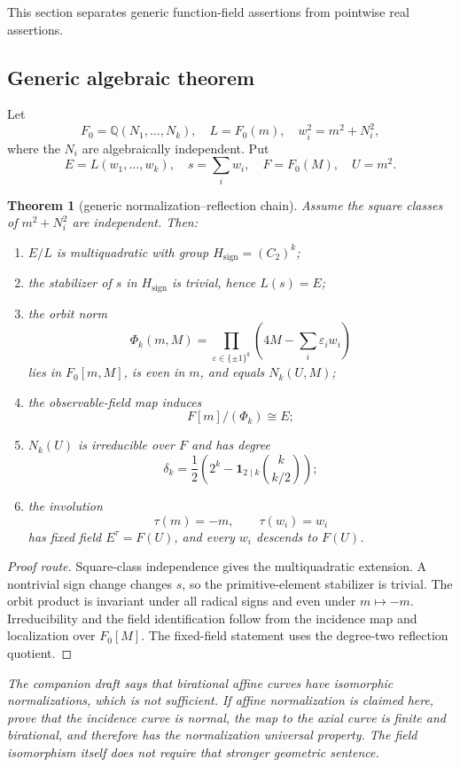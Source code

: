 \documentclass[11pt]{article}
\newtheorem{theorem}{Theorem}[section]
\theoremstyle{remark}
\newcommand{\Q}{\mathbb Q}
\newcommand{\proofstop}[1]{\par\medskip\noindent{\color{red!75!black}\textbf{STOP--PROOF.}} \textit{#1}\par\medskip}
\begin{document}
This section separates generic function-field assertions from pointwise real
assertions.

\subsection{Generic algebraic theorem}

Let
\[
F_0=\Q(N_1,\ldots,N_k),\quad L=F_0(m),\quad
w_i^2=m^2+N_i^2,
\]
where the $N_i$ are algebraically independent. Put
\[
E=L(w_1,\ldots,w_k),\quad s=\sum_iw_i,\quad
F=F_0(M),\quad U=m^2.
\]

\begin{theorem}[generic normalization--reflection chain]
\label{thm:genericcover}
Assume the square classes of $m^2+N_i^2$ are independent. Then:
\begin{enumerate}[label=(\roman*)]
\item $E/L$ is multiquadratic with group $H_{\mathrm{sign}}=(C_2)^k$;
\item the stabilizer of $s$ in $H_{\mathrm{sign}}$ is trivial, hence
$L(s)=E$;
\item the orbit norm
\[
\Phi_k(m,M)=
\prod_{\varepsilon\in\{\pm1\}^k}
\left(4M-\sum_i\varepsilon_iw_i\right)
\]
lies in $F_0[m,M]$, is even in $m$, and equals $N_k(U,M)$;
\item the observable-field map induces
\[
F[m]/(\Phi_k)\cong E;
\]
\item $N_k(U)$ is irreducible over $F$ and has degree
\[
\delta_k=\frac12\left(
2^k-\mathbf 1_{2\mid k}\binom{k}{k/2}
\right);
\]
\item the involution
\[
\tau(m)=-m,\qquad\tau(w_i)=w_i
\]
has fixed field $E^\tau=F(U)$, and every $w_i$ descends to $F(U)$.
\end{enumerate}
\end{theorem}

\begin{proof}[Proof route]
Square-class independence gives the multiquadratic extension. A nontrivial
sign change changes $s$, so the primitive-element stabilizer is trivial.
The orbit product is invariant under all radical signs and even under
$m\mapsto-m$. Irreducibility and the field identification follow from
the incidence map and localization over $F_0[M]$. The fixed-field statement
uses the degree-two reflection quotient.
\end{proof}

\proofstop{The companion draft says that birational affine curves have
isomorphic normalizations, which is not sufficient. If affine normalization
is claimed here, prove that the incidence curve is normal, the map to the
axial curve is finite and birational, and therefore has the normalization
universal property. The field isomorphism itself does not require that
stronger geometric sentence.}
\end{document}
